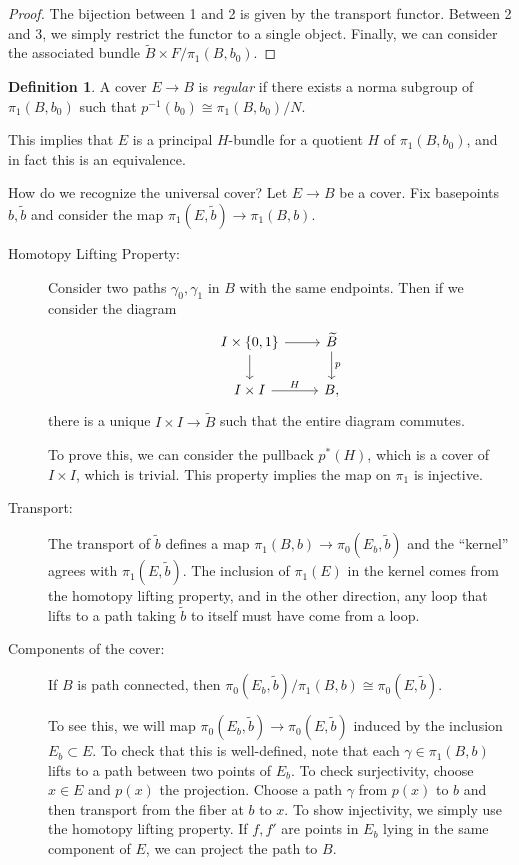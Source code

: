 \documentclass[leqno, openany]{memoir}
\theoremstyle{definition}
\newtheorem{defn}[thm]{Definition}
\theoremstyle{remark}
\theoremstyle{plain}
\theoremstyle{definition}
\theoremstyle{remark}
\newcommand{\wt}[1]{\widetilde{#1}}
\begin{document}
\begin{proof} The bijection between 1 and 2 is given by the transport functor.
Between 2 and 3, we simply restrict the functor to a single object. Finally, we
can consider the associated bundle $\wt{B} \times F / \pi_1(B,b_0)$.
\end{proof}

\begin{defn} A cover $E \to B$ is \textit{regular} if there exists a norma
subgroup of $\pi_1(B,b_0)$ such that $p^{-1}(b_0) \cong \pi_1(B,b_0) / N$.
\end{defn}

This implies that $E$ is a principal $H$-bundle for a quotient $H$ of
$\pi_1(B,b_0)$, and in fact this is an equivalence.

How do we recognize the universal cover? Let $E \to B$ be a cover. Fix
basepoints $b, \wt{b}$ and consider the map $\pi_1(E, \wt{b}) \to \pi_1(B,b)$.
\begin{description} \item[Homotopy Lifting Property:] Consider two paths
    $\gamma_0, \gamma_1$ in $B$ with the same endpoints. Then if we consider
    the diagram \begin{equation} \begin{tikzcd} I \times \{ 0,1 \} \arrow{r}
    \arrow{d} & \wt{B} \arrow{d}{p} \\ I \times I \arrow{r}{H} & B,
\end{tikzcd} \end{equation} there is a unique $I \times I \to \wt{B}$ such that
the entire diagram commutes.

        To prove this, we can consider the pullback $p^*(H)$, which is a cover
        of $I \times I$, which is trivial. This property implies the map on
        $\pi_1$ is injective.  \item[Transport:] The transport of $\wt{b}$
        defines a map $\pi_1(B,b) \to \pi_0(E_b, \wt{b})$ and the ``kernel''
        agrees with $\pi_1(E, \wt{b})$. The inclusion of $\pi_1(E)$ in the
        kernel comes from the homotopy lifting property, and in the other
        direction, any loop that lifts to a path taking $\wt{b}$ to itself must
        have come from a loop.  \item[Components of the cover:] If $B$ is path
        connected, then $\pi_0(E_b,\wt{b}) / \pi_1(B,b) \cong \pi_0(E,\wt{b})$.

        To see this, we will map $\pi_0(E_b, \wt{b}) \to \pi_0(E, \wt{b})$
induced by the inclusion $E_b \subset E$. To check that this is well-defined,
note that each $\gamma \in \pi_1(B,b)$ lifts to a path between two points of
$E_b$. To check surjectivity, choose $x \in E$ and $p(x)$ the projection.
Choose a path $\gamma$ from $p(x)$ to $b$ and then transport from the fiber at
$b$ to $x$. To show injectivity, we simply use the homotopy lifting property.
If $f, f'$ are points in $E_b$ lying in the same component of $E$, we can
project the path to $B$.  \end{description}
\end{document}
